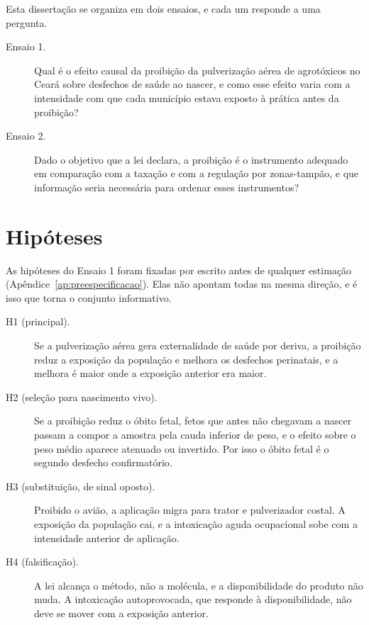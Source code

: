 Esta dissertação se organiza em dois ensaios, e cada um responde a uma
pergunta.

\begin{description}
  \item[Ensaio 1.] Qual é o efeito causal da proibição da pulverização aérea de
    agrotóxicos no Ceará sobre desfechos de saúde ao nascer, e como esse efeito
    varia com a intensidade com que cada município estava exposto à prática
    antes da proibição?
  \item[Ensaio 2.] Dado o objetivo que a lei declara, a proibição é o
    instrumento adequado em comparação com a taxação e com a regulação por
    zonas-tampão, e que informação seria necessária para ordenar esses
    instrumentos?
\end{description}

\section{Hipóteses}
\label{sec:hipoteses}

As hipóteses do Ensaio 1 foram fixadas por escrito antes de qualquer
estimação (Apêndice~\ref{ap:preespecificacao}). Elas não apontam todas na mesma
direção, e é isso que torna o conjunto informativo.

\begin{description}
  \item[H1 (principal).] Se a pulverização aérea gera externalidade de saúde por
    deriva, a proibição reduz a exposição da população e melhora os desfechos
    perinatais, e a melhora é maior onde a exposição anterior era maior.
  \item[H2 (seleção para nascimento vivo).] Se a proibição reduz o óbito fetal,
    fetos que antes não chegavam a nascer passam a compor a amostra pela cauda
    inferior de peso, e o efeito sobre o peso médio aparece atenuado ou
    invertido. Por isso o óbito fetal é o segundo desfecho confirmatório.
  \item[H3 (substituição, de sinal oposto).] Proibido o avião, a aplicação migra
    para trator e pulverizador costal. A exposição da população cai, e a
    intoxicação aguda ocupacional sobe com a intensidade anterior de aplicação.
  \item[H4 (falsificação).] A lei alcança o método, não a molécula, e a
    disponibilidade do produto não muda. A intoxicação autoprovocada, que
    responde à disponibilidade, não deve se mover com a exposição anterior.
\end{description}

